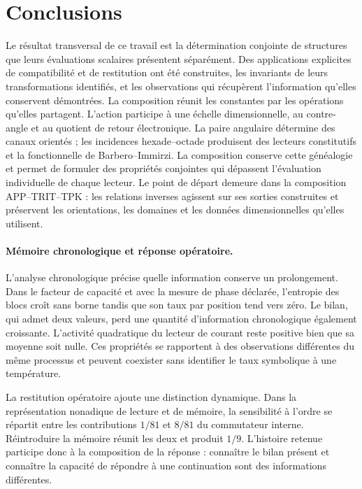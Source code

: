 \section{Conclusions}
\label{md:conclusiones}
Le résultat transversal de ce travail est la détermination conjointe de
structures que leurs évaluations scalaires présentent séparément. Des
applications explicites de compatibilité et de restitution ont été construites, les invariants
de leurs transformations identifiés, et les observations qui
récupèrent l’information qu’elles conservent démontrées. La composition réunit les constantes
par les opérations qu’elles partagent.
L’action participe à une échelle dimensionnelle, au contre-angle et au
quotient de retour électronique. La paire angulaire détermine des canaux
orientés ; les incidences hexade--octade produisent des lecteurs constitutifs
et la fonctionnelle de Barbero--Immirzi. La composition conserve cette généalogie
et permet de formuler des propriétés conjointes qui dépassent l’évaluation
individuelle de chaque lecteur. Le point de départ demeure dans la composition
APP--TRIT--TPK : les relations inverses agissent sur ses sorties construites
et préservent les orientations, les domaines et les données dimensionnelles
qu’elles utilisent.

\paragraph{Mémoire chronologique et réponse opératoire.}

L’analyse chronologique précise quelle information conserve un prolongement.
Dans le facteur de capacité et avec la mesure de phase déclarée, l’entropie
des blocs croît sans borne tandis que son taux par position tend vers zéro.
Le bilan, qui admet deux valeurs, perd une quantité d’information
chronologique également croissante. L’activité quadratique du lecteur de
courant reste positive bien que sa moyenne soit nulle. Ces propriétés
se rapportent à des observations différentes du même processus et peuvent
coexister sans identifier le taux symbolique à une température.

La restitution opératoire ajoute une distinction dynamique. Dans la
représentation nonadique de lecture et de mémoire, la sensibilité à l’ordre
se répartit entre les contributions \(1/81\) et \(8/81\) du
commutateur interne. Réintroduire la mémoire réunit les deux et produit
\(1/9\). L’histoire retenue participe donc à la composition
de la réponse : connaître le bilan présent et connaître la capacité
de répondre à une continuation sont des informations différentes.


